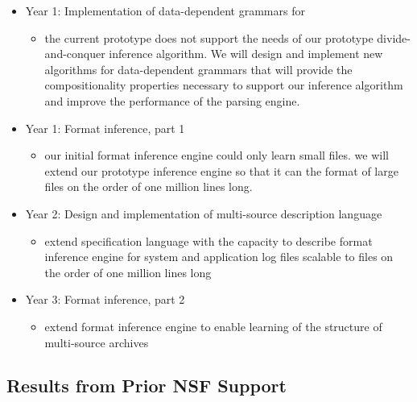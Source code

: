 \documentclass[10pt]{article}
\begin{document}
\begin{itemize}
\item Year 1:  Implementation of data-dependent grammars for \pads{}
  \begin{itemize}
    \item the current \pads{} prototype does not support the needs of
            our prototype divide-and-conquer inference algorithm.
            We will design and implement new algorithms for data-dependent
            grammars that will provide the compositionality 
            properties necessary to support our inference algorithm
            and improve the performance
            of the \pads{} parsing 
            engine.
  \end{itemize}
\item Year 1:  Format inference, part 1
  \begin{itemize}
    \item our initial format inference engine could only learn small files.
       we will extend our prototype inference engine so that it can
       the format of large files on the order of one million lines long.
  \end{itemize}
\item Year 2:  Design and implementation of multi-source description language
  \begin{itemize}
    \item extend \pads{} specification language with the capacity to describe
          format inference engine for system and application log files 
       scalable to files on the order of one million lines long
  \end{itemize}  
\item Year 3:  Format inference, part 2
  \begin{itemize}
    \item extend format inference engine to enable learning of the structure
       of multi-source archives
  \end{itemize}
\end{itemize}

\subsection{Results from Prior NSF Support}
\label{ssec:results}
\end{document}
